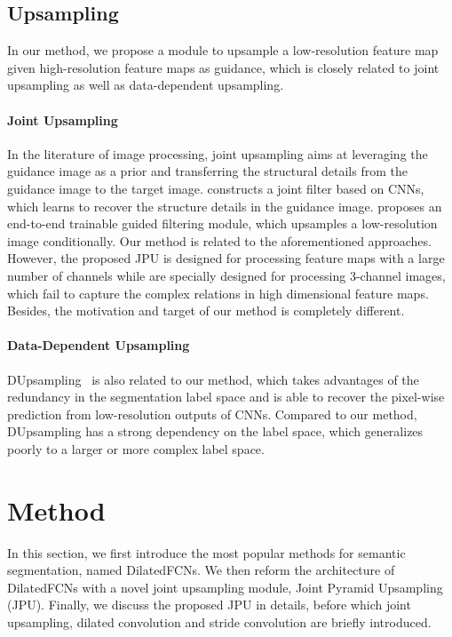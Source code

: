 \documentclass[10pt,twocolumn,letterpaper]{article}
\begin{document}
\subsection{Upsampling}
In our method, we propose a module to upsample a low-resolution feature map given high-resolution feature maps as guidance, which is closely related to joint upsampling as well as data-dependent upsampling.
\vspace{-1em}
\paragraph{Joint Upsampling}
In the literature of image processing, joint upsampling aims at leveraging the guidance image as a prior and transferring the structural details from the guidance image to the target image.
\cite{li2016deep} constructs a joint filter based on CNNs, which learns to recover the structure details in the guidance image.
\cite{wu2018fast} proposes an end-to-end trainable guided filtering module, which upsamples a low-resolution image conditionally.
Our method is related to the aforementioned approaches.
However, the proposed JPU is designed for processing feature maps with a large number of channels while \cite{li2016deep,wu2018fast} are specially designed for processing 3-channel images, which fail to capture the complex relations in high dimensional feature maps.
Besides, the motivation and target of our method is completely different.
\vspace{-1em}
\paragraph{Data-Dependent Upsampling}
DUpsampling~\cite{tian2019decoders} is also related to our method, which takes advantages of the redundancy in the segmentation label space and is able to recover the pixel-wise prediction from low-resolution outputs of CNNs.
Compared to our method, DUpsampling has a strong dependency on the label space, which generalizes poorly to a larger or more complex label space.
\section{Method}
In this section, we first introduce the most popular methods for semantic segmentation, named DilatedFCNs.
We then reform the architecture of DilatedFCNs with a novel joint upsampling module, Joint Pyramid Upsampling (JPU).
Finally, we discuss the proposed JPU in details, before which joint upsampling, dilated convolution and stride convolution are briefly introduced.
\end{document}
